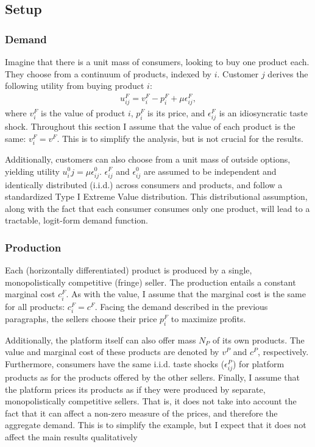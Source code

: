 \documentclass[a4paper]{article}
\begin{document}
\subsection{Setup}

\subsubsection{Demand}

Imagine that there is a unit mass of consumers, looking to buy one product each.
They choose from a continuum of products, indexed by $i$.
Customer $j$ derives the following utility from buying product $i$:
\begin{align*}
    u^F_{ij} = v^F_i - p^F_i + \mu\epsilon^F_{ij},
\end{align*}
where $v^F_i$ is the value of product $i$, $p^F_i$ is its price, and $\epsilon^F_{ij}$ is an idiosyncratic taste shock.
Throughout this section I assume that the value of each product is the same: $v^F_i = v^F$.
This is to simplify the analysis, but is not crucial for the results.  %

Additionally, customers can also choose from a unit mass of outside options, yielding utility $u^0_ij = \mu\epsilon^0_{ij}$. $\epsilon^F_{ij}$ and $\epsilon^0_{ij}$ are assumed to be independent and identically distributed (i.i.d.) across consumers and products, and follow a standardized Type I Extreme Value distribution. This distributional assumption, along with the fact that each consumer consumes only one product, will lead to a tractable, logit-form demand function.

\subsubsection{Production}

Each (horizontally differentiated) product is produced by a single, monopolistically competitive (fringe) seller.
The production entails a constant marginal cost $c^F_i$.
As with the value, I assume that the marginal cost is the same for all products: $c^F_i = c^F$.
Facing the demand described in the previous paragraphs, the sellers choose their price $p^F_i$ to maximize profits.

Additionally, the platform itself can also offer mass $N_P$ of its own products.
The value and marginal cost of these products are denoted by $v^P$ and $c^P$, respectively.
Furthermore, consumers have the same i.i.d. taste shocks ($\epsilon^P_{ij}$) for platform products as for the products offered by the other sellers.
Finally, I assume that the platform prices its products as if they were produced by separate, monopolistically competitive sellers.
That is, it does not take into account the fact that it can affect a non-zero measure of the prices, and therefore the aggregate demand.
This is to simplify the example, but I expect that it does not affect the main results qualitatively
\end{document}
